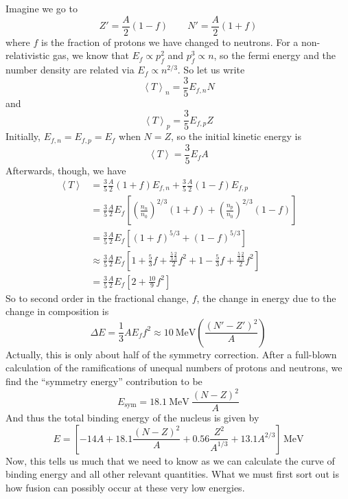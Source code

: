 \documentclass[10pt]{article}
\numberwithin{equation}{section}
\newcommand{\n}{\noindent}
\newcommand{\avg}[1]{\left\langle#1\right\rangle}
\begin{document}
  \n Imagine we go to
  \begin{equation}
    \label{eq:379}
    Z'=\frac{A}{2}(1-f)\qquad N'=\frac{A}{2}(1+f)
  \end{equation}
  where $f$ is the fraction of protons we have changed to
  neutrons. For a non-relativistic gas, we know that $E_f\propto
  p_f^2$ and $p_f^3\propto n$, so the fermi energy and the number
  density are related via $E_f\propto n^{2/3}$. So let us write
  \begin{equation}
    \label{eq:380}
    \avg{T}_n=\frac{3}{5}E_{f,n}N
  \end{equation}
  and
  \begin{equation}
    \label{eq:381}
    \avg{T}_p=\frac{3}{5}E_{f,p}Z
  \end{equation}
  Initially, $E_{f,n}=E_{f,p}=E_f$ when $N=Z$, so the initial kinetic
  energy is
  \begin{equation}
    \label{eq:382}
    \avg{T}=\frac{3}{5}E_fA
  \end{equation}
  Afterwards, though, we have
  \begin{align}
    \label{eq:383}
    \avg{T}&=\frac{3}{5}\frac{A}{2}(1+f)E_{f,n}+\frac{3}{5}\frac{A}{2}(1-f)E_{f,p}\\
    \label{eq:383a}
    &=
    \frac{3}{5}\frac{A}{2}E_f\left[\left(\frac{n_n}{n_0}\right)^{2/3}(1+f)+\left(\frac{n_p}{n_0}\right)^{2/3}(1-f)\right]\\
    \label{eq:383b}
    &= \frac{3}{5}\frac{A}{2}E_f\left[(1+f)^{5/3}+(1-f)^{5/3}\right]\\
    \label{eq:383c}
    &\approx
    \frac{3}{5}\frac{A}{2}E_f\left[1+\frac{5}{3}f+\frac{\frac{5}{3}\frac{2}{3}}{2}f^2+1-\frac{5}{3}f+\frac{\frac{5}{3}\frac{2}{3}}{2}f^2\right]\\
      \label{eq:383d}
      &= \frac{3}{5}\frac{A}{2}E_f\left[2+\frac{10}{9}f^2\right]
  \end{align}
  So to second order in the fractional change, $f$, the change in
  energy due to the change in composition is
  \begin{equation}
    \label{eq:384}
    \Delta E=\frac{1}{3}AE_f f^2\approx 10\ \mathrm{MeV}\left(\frac{(N'-Z')^2}{A}\right)
  \end{equation}
  Actually, this is only about half of the symmetry correction. After
  a full-blown calculation of the ramifications of unequal numbers of
  protons and neutrons, we find the ``symmetry energy'' contribution
  to be
  \begin{equation}
    \label{eq:275}
    E_{\mathrm{sym}}=18.1\ \mathrm{MeV}\ \frac{(N-Z)^2}{A}
  \end{equation}
  And thus the total binding energy of the nucleus is given by
  \begin{equation}
    \label{eq:304}
    \boxed{E=\left[-14A+18.1\frac{(N-Z)^2}{A}+0.56\frac{Z^2}{A^{1/3}}+13.1
    A^{2/3}\right]\, \mathrm{MeV}}
  \end{equation}
  Now, this tells us much that we need to know as we can calculate the
  curve of binding energy and all other relevant quantities. What we
  must first sort out is how fusion can possibly occur at these very
  low energies.\\
\end{document}
